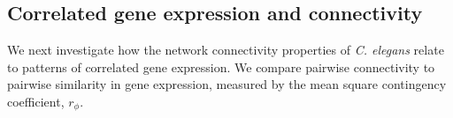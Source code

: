 \documentclass[10pt,letterpaper]{article}
\begin{document}

\subsection*{Correlated gene expression and connectivity}

We next investigate how the network connectivity properties of \emph{C. elegans} relate to patterns of correlated gene expression.
We compare pairwise connectivity to pairwise similarity in gene expression, measured by the mean square contingency coefficient, $r_\phi$.
\end{document}

